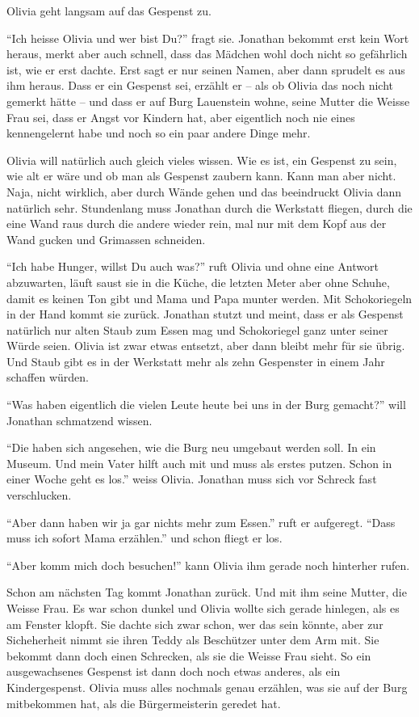 Olivia geht langsam auf das Gespenst zu. 

\enquote{Ich heisse Olivia und wer bist Du?} fragt sie. Jonathan bekommt erst kein Wort heraus, merkt aber auch schnell, dass das Mädchen wohl doch nicht so gefährlich ist, wie er erst dachte. Erst sagt er nur seinen Namen, aber dann sprudelt es aus ihm heraus. Dass er ein Gespenst sei, erzählt er -- als ob Olivia das noch nicht gemerkt hätte -- und dass er auf Burg Lauenstein wohne, seine Mutter die Weisse Frau sei, dass er Angst vor Kindern hat, aber eigentlich noch nie eines kennengelernt habe und noch so ein paar andere Dinge mehr. 

Olivia will natürlich auch gleich vieles wissen. Wie es ist, ein Gespenst zu sein, wie alt er wäre und ob man als Gespenst zaubern kann. Kann man aber nicht. Naja, nicht wirklich, aber durch Wände gehen und das beeindruckt Olivia dann natürlich sehr. Stundenlang muss Jonathan durch die Werkstatt fliegen, durch die eine Wand raus durch die andere wieder rein, mal nur mit dem Kopf aus der Wand gucken und Grimassen schneiden. 

\enquote{Ich habe Hunger, willst Du auch was?} ruft Olivia und ohne eine Antwort abzuwarten, läuft saust sie in die Küche, die letzten Meter aber ohne Schuhe, damit es keinen Ton gibt und Mama und Papa munter werden. Mit Schokoriegeln in der Hand kommt sie zurück. Jonathan stutzt und meint, dass er als Gespenst natürlich nur alten Staub zum Essen mag und Schokoriegel ganz unter seiner Würde seien. Olivia ist zwar etwas entsetzt, aber dann bleibt mehr für sie übrig. Und Staub gibt es in der Werkstatt mehr als zehn Gespenster in einem Jahr schaffen würden.

\enquote{Was haben eigentlich die vielen Leute heute bei uns in der Burg gemacht?} will Jonathan schmatzend wissen.

\enquote{Die haben sich angesehen, wie die Burg neu umgebaut werden soll. In ein Museum. Und mein Vater hilft auch mit und muss als erstes putzen. Schon in einer Woche geht es los.} weiss Olivia. Jonathan muss sich vor Schreck fast verschlucken.

\enquote{Aber dann haben wir ja gar nichts mehr zum Essen.} ruft er aufgeregt. \enquote{Dass muss ich sofort Mama erzählen.} und schon fliegt er los.

\enquote{Aber komm mich doch besuchen!} kann Olivia ihm gerade noch hinterher rufen.

Schon am nächsten Tag kommt Jonathan zurück. Und mit ihm seine Mutter, die Weisse Frau. Es war schon dunkel und Olivia wollte sich gerade hinlegen, als es am Fenster klopft. Sie dachte sich zwar schon, wer das sein könnte, aber zur Sicheherheit nimmt sie ihren Teddy als Beschützer unter dem Arm mit. Sie bekommt dann doch einen Schrecken, als sie die Weisse Frau sieht. So ein ausgewachsenes Gespenst ist dann doch noch etwas anderes, als ein Kindergespenst. Olivia muss alles nochmals genau erzählen, was sie auf der Burg mitbekommen hat, als die Bürgermeisterin geredet hat.

